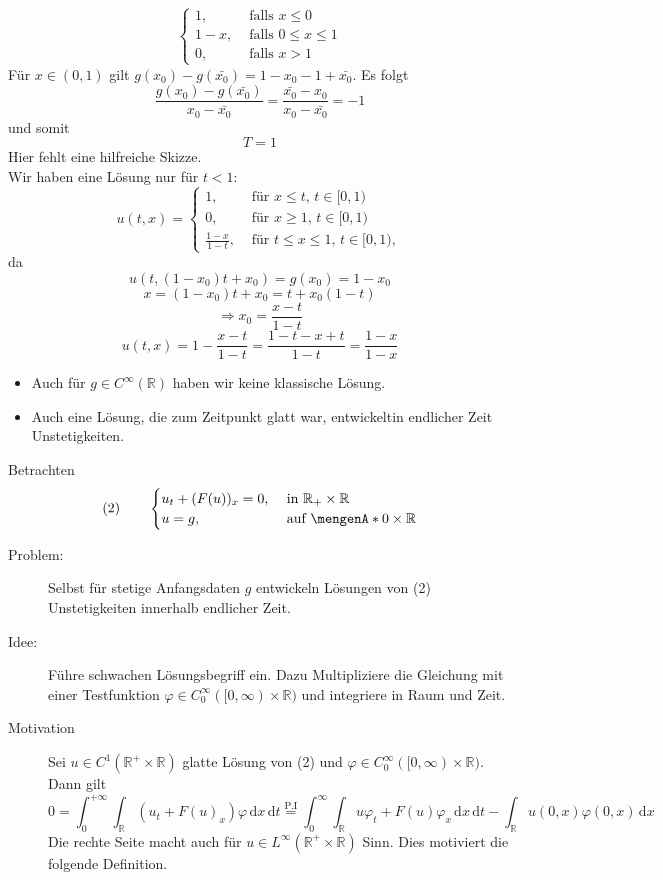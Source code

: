 \begin{enumerate}[1.)]
\begin{beispiel}
\[\begin{cases}
				1, &\text{ falls }x \leq 0\\
				1-x, &\text{ falls } 0 \leq x \leq 1 \\
				0, &\text{ falls }x >1
			\end{cases}
		\]
		Für $x \in (0,1)$ gilt $g(x_0) - g(\bar{x_0}) = 1 - x_0 - 1+ \bar{x_0}$.
		Es folgt
		\[
			\frac{g(x_0)-g(\bar{x_0})}{x_0- \bar{x_0}} = \frac{\bar{x_0}-x_0}{x_0-\bar{x_0}} = -1
		\]
		und somit
		\[
			T=1
		\]
		Hier fehlt eine hilfreiche Skizze.  \\
		Wir haben eine Lösung nur für $t<1:$
		\[
			u(t,x) = \begin{cases}
				1, &\text{ für }x \leq t, \, t \in [0,1)\\
				0, &\text{ für }x \geq 1, \, t \in [0,1)\\
				\frac{1-x}{1-t},& \text{ für }t \leq x \leq 1, \, t \in [0,1),
			\end{cases}
		\]
		da 
		\[
			u(t,(1-x_0)t+x_0) = g(x_0) = 1-x_0
		\]
		\[
			x = (1-x_0)t + x_0 = t + x_0 (1-t)
		\]
		\[
			\Rightarrow x_0 = \frac{x-t}{1-t}
		\]
		\[
			u(t,x)= 1- \frac{x-t}{1-t} = \frac{1-t-x+t}{1-t} = \frac{1-x}{1-x}
		\]
	\end{beispiel}
	\begin{bemerkung}
		\begin{itemize}
			\item Auch für $g \in C^{\infty}(\mathbb{R})$ haben wir keine klassische Lösung.
			\item Auch eine Lösung, die zum Zeitpunkt glatt war, entwickeltin endlicher Zeit Unstetigkeiten.
		\end{itemize}
	\end{bemerkung}
\end{enumerate}
Betrachten 
\[
	(2) \qquad \begin{cases}
		u_t + (F(u))_x = 0, &\text{ in }\mathbb{R}_+ \times \mathbb{R}\\
		u=g , &\text{ auf } \set{0} \times \mathbb{R}
	\end{cases}
\]
\begin{description}
	\item[Problem:]Selbst für stetige Anfangsdaten $g$ entwickeln Lösungen von (2) Unstetigkeiten innerhalb endlicher Zeit.
	\item[Idee:] Führe schwachen Lösungsbegriff ein. Dazu Multipliziere die Gleichung mit einer Testfunktion $\varphi \in C^{\infty}_0([0,\infty) \times \mathbb{R})$
	und integriere in Raum und Zeit.
	\item[Motivation] Sei $u \in C^1(\mathbb{R}^+ \times \mathbb{R})$ glatte Lösung von (2) und $\varphi \in C^{\infty}_0([0, \infty) \times \mathbb{R})$. Dann gilt
	\[
		0 = \int_{0}^{+ \infty} \int_{\mathbb{R}}^{} (u_t + F(u)_x) \varphi \,\mathrm{d}x \,\mathrm{d}t \stackrel{\text{P.I}}{=} \int_{0}^{\infty} \int_{\mathbb{R}}^{}
		u \varphi_t + F(u) \varphi_x \,\mathrm{d}x \,\mathrm{d}t - \int_{\mathbb{R}}^{} u(0,x)\varphi(0,x) \,\mathrm{d}x
	\] 
	Die rechte Seite macht auch für $u \in L^{\infty}(\mathbb{R}^+ \times \mathbb{R})$ Sinn. Dies motiviert die folgende Definition.
\end{description}
